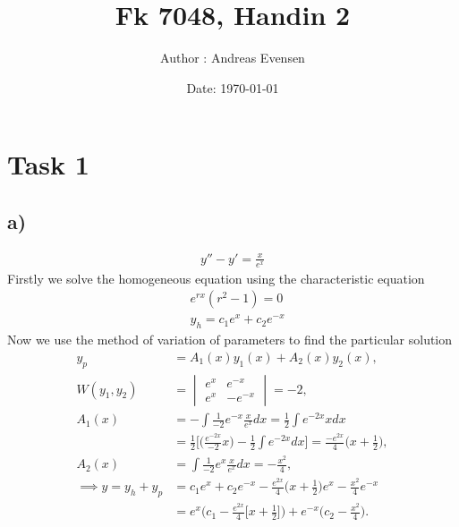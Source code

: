 \documentclass[]{article}
\title{Fk 7048, Handin 2}
\author{Author : Andreas Evensen}
\date{Date: \today}
\begin{document}
\maketitle

\section*{Task 1}

\subsection*{a)}
\begin{align*}
    y'' - y' = \frac{x}{e^x}
\end{align*}
Firstly we solve the homogeneous equation using the characteristic equation
\begin{align*}
    &e^{rx}(r^2 - 1) = 0\\
    &y_h = c_1e^x + c_2e^{-x}
\end{align*}
Now we use the method of variation of parameters to find the particular solution
\begin{align*}
    y_p &= A_1(x)y_1(x) + A_2(x)y_2(x),\\
    W(y_1, y_2) &=
    \begin{vmatrix}
        e^x & e^{-x}\\
        e^x & -e^{-x}
    \end{vmatrix} = -2,\\
    A_1(x) &= -\int \frac{1}{-2}e^{-x}\frac{x}{e^x}dx=\frac{1}{2}\int e^{-2x}xdx\\
    &= \frac{1}{2}\Bigg[\Big(\frac{e^{-2x}}{-2}x\Big) - \frac{1}{2}\int e^{-2x}dx\Bigg] = \frac{-e^{2x}}{4}\Big(x+\frac{1}{2}\Big),\\
    A_2(x) &= \int \frac{1}{-2}e^{x}\frac{x}{e^{x}}dx =-\frac{x^2}{4},\\
    \implies y = y_h + y_p &= c_1e^x + c_2e^{-x} -\frac{e^{2x}}{4}\Big(x+\frac{1}{2}\Big)e^x -\frac{x^2}{4}e^{-x}\\
    &= e^x\Big(c_1 - \frac{e^{2x}}{4}\big[x+\frac{1}{2}\big]\Big) + e^{-x}\Big(c_2 - \frac{x^2}{4}\Big).
\end{align*}
\end{document}
